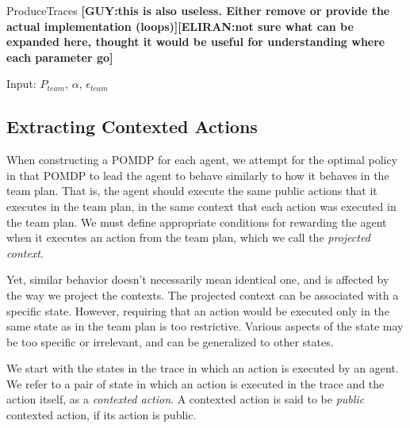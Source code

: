 \documentclass[letterpaper]{article} %
\newcommand{\eliran}[1]{\textbf{[\color{red}ELIRAN:#1]}}
\newcommand{\guy}[1]{\textbf{[\color{orange}GUY:#1]}}
\begin{document}
\begin{algorithm}
\caption{ProduceTraces \guy{this is also useless. Either remove or provide the actual implementation (loops)}\eliran{not sure what can be expanded here, thought it would be useful for understanding where each parameter go}}
\begin{algorithmic}[tbph]
\State Input: $P_{team}$, $\alpha$, $\epsilon_{team}$
\end{algorithmic}
\end{algorithm}

\subsection{Extracting Contexted Actions}
When constructing a POMDP for each agent, we attempt for the optimal policy in that POMDP to lead the agent to behave similarly to how it behaves in the team plan. That is, the agent should execute the same public actions that it executes in the team plan, in the same context that each action was executed in the team plan. We must define appropriate conditions for rewarding the agent when it executes an action from the team plan, which we
call the \emph{projected context}. 

Yet, similar behavior doesn't necessarily mean identical one, and is affected by the way we project the contexts.
The projected context can be associated with a specific state. However, requiring that an action would be executed only in the same state as in the team plan is too restrictive. Various aspects of the state may be too specific or irrelevant, and can be generalized to other states.

We start with the states in the trace in which an action is executed by an agent. We refer to a pair of state in which
an action is executed in the trace and the action itself,
as a \emph{contexted action}. A contexted action is said to be \emph{public} contexted action, if its action is public.
\end{document}
